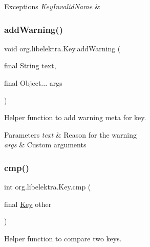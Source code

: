 \begin{DoxyExceptions}{Exceptions}
{\em Key\+Invalid\+Name} & \\
\hline
\end{DoxyExceptions}
\mbox{\label{classorg_1_1libelektra_1_1Key_a542a69d75c304dda3f78cb3b185022ee}} 
\subsubsection{\texorpdfstring{addWarning()}{addWarning()}}
{\footnotesize\ttfamily void org.\+libelektra.\+Key.\+add\+Warning (\begin{DoxyParamCaption}\item[{final String}]{text,  }\item[{final Object...}]{args }\end{DoxyParamCaption})\hspace{0.3cm}{\ttfamily [inline]}}



Helper function to add warning meta for key. 


\begin{DoxyParams}{Parameters}
{\em text} & Reason for the warning \\
\hline
{\em args} & Custom arguments \\
\hline
\end{DoxyParams}
\mbox{\label{classorg_1_1libelektra_1_1Key_aa5271913871c1ee2f31f32190a7e14aa}} 
\subsubsection{\texorpdfstring{cmp()}{cmp()}}
{\footnotesize\ttfamily int org.\+libelektra.\+Key.\+cmp (\begin{DoxyParamCaption}\item[{final \mbox{\hyperlink{classorg_1_1libelektra_1_1Key}{Key}}}]{other }\end{DoxyParamCaption})\hspace{0.3cm}{\ttfamily [inline]}}



Helper function to compare two keys. 

